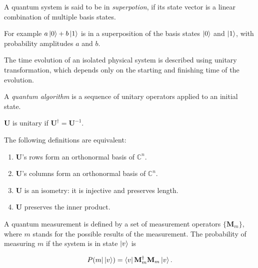 \begin{definition}[Superposition]

A quantum system is said to be in \textit{superpotion}, if its state vector is a linear combination of multiple basis states.

For example $a\ket{0} + b\ket{1}$ is in a superposition of the basis states $\ket{0}$ and $\ket{1}$, with probability amplitudes $a$ and $b$.

\end{definition}

\label{PostulateII}

The time evolution of an isolated physical system is described using unitary transformation, which depends only on the starting and finishing time of the evolution.

A \textit{quantum algorithm} is a sequence of unitary operators applied to an initial state.

\begin{definition}

$\mathbf{U}$ is unitary if $\mathbf{U}^{\dagger} = \mathbf{U}^{-1}$.


The following definitions are equivalent:

\begin{enumerate}
    \item $\mathbf{U}$'s rows form an orthonormal basis of $\mathds{C}^n$.
    \item $\mathbf{U}$'s columns form an orthonormal basis of $\mathds{C}^n$.
    \item $\mathbf{U}$ is an isometry: it is injective and preserves length.
    \item $\mathbf{U}$ preserves the inner product.
\end{enumerate}

\end{definition}


A quantum measurement is defined by a set of measurement operators $\{\mathbf{M}_m\}$, where $m$ stands for the possible results of the measurement. The probability of measuring $m$ if the system is in state $\ket{v}$ is

\begin{align*}
    P(m | \ket{v}) = \bra{v} \mathbf{M}_m^{\dagger} \mathbf{M}_m \ket{v}.
\end{align*}

